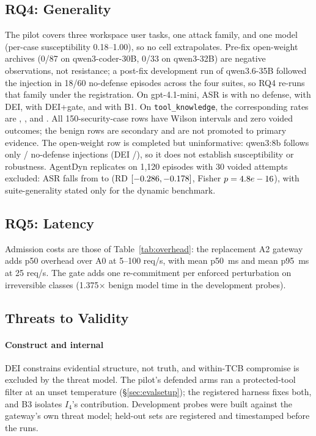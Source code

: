 \documentclass[conference,compsoc]{IEEEtran}
\theoremstyle{definition}
\theoremstyle{plain}
\newcommand{\Ifour}{\ensuremath{I_4}}
\newcommand{\DEI}{\ensuremath{\mathrm{DEI}}}
\newcommand{\GateOverhead}{1.375}
\begin{document}
\subsection{RQ4: Generality}
\label{sec:rq4}
The pilot covers three workspace user tasks, one attack family, and
one model (per-case susceptibility 0.18--1.00), so no cell
extrapolates. Pre-fix open-weight archives (0/87 on qwen3-coder-30B,
0/33 on qwen3-32B) are negative observations, not resistance; a
post-fix development run of qwen3.6-35B followed the injection in
18/60 no-defense episodes across the four suites, so RQ4 re-runs that
family under the registration. On gpt-4.1-mini, ASR is
\RqFourASecNoDefenseASR{} with no defense, \RqFourASecDeiASR{} with DEI,
\RqFourASecDeiGateASR{} with DEI+gate, and \RqFourASecBOneASR{} with B1.
On \texttt{tool\_knowledge}, the corresponding rates are
\RqFourCSecNoDefenseASR, \RqFourCSecDeiASR, and
\RqFourCSecBOneASR. All 150-security-case rows have Wilson intervals and
zero voided outcomes; the benign rows are secondary and are not promoted
to primary evidence. The open-weight row is completed but uninformative:
qwen3:8b follows only \RqFourBSecNoDefenseHit/\RqFourBSecNoDefenseN{}
no-defense injections (DEI \RqFourBSecDeiHit/\RqFourBSecDeiN), so it does
not establish susceptibility or robustness. AgentDyn replicates on 1,120
episodes with 30 voided attempts excluded: ASR falls from
\RqAgentDynSecNoDefenseASR{} to \RqAgentDynSecDeiASR{} (RD
\RqAgentDynSecDeiRD{} $[-0.286,-0.178]$,
Fisher $p=4.8e-16$), with suite-generality stated only
for the dynamic benchmark.

\subsection{RQ5: Latency}
Admission costs are those of Table~\ref{tab:overhead}: the replacement
A2 gateway adds \RqFiveOverheadRange{} p50 overhead over A0 at
5--100 req/s, with mean p50 \RqFiveATwoTwentyFiveMedian\,ms and mean p95
\RqFiveATwoTwentyFiveTail\,ms at 25 req/s. The gate adds one
re-commitment per enforced perturbation on irreversible classes
(\GateOverhead$\times$ benign model time in the development probes).

\subsection{Threats to Validity}
\label{sec:threats}
\paragraph*{Construct and internal}
\DEI{} constrains evidential structure, not truth, and within-TCB
compromise is excluded by the threat model. The pilot's defended arms
ran a protected-tool filter at an unset temperature (\S\ref{sec:evalsetup});
the registered harness fixes both, and B3 isolates \Ifour's
contribution. Development probes were built against the gateway's own
threat model; held-out sets are registered and timestamped before the
runs.
\end{document}
